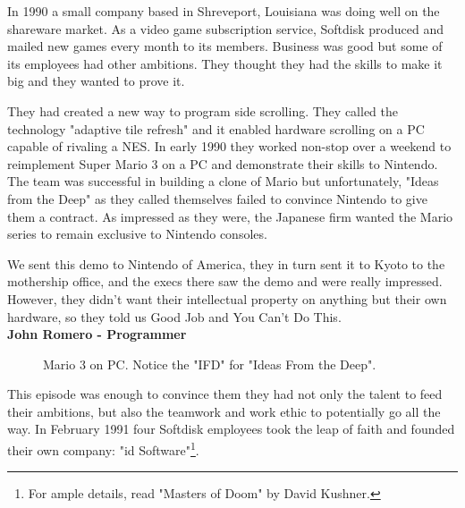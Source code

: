\documentclass[book.tex]{subfiles}
\begin{document}
In 1990 a small company based in Shreveport, Louisiana was doing well on the shareware market. As a video game subscription service, Softdisk produced and mailed new games every month to its members. Business was good but some of its employees had other ambitions. They thought they had the skills to make it big and they wanted to prove it.\\
\par
They had created a new way to program side scrolling. They called the technology "adaptive tile refresh" and it enabled hardware scrolling on a PC capable of rivaling a NES. In early 1990 they worked non-stop over a weekend to reimplement Super Mario 3 on a PC and demonstrate their skills to Nintendo. The team was successful in building a clone of Mario but unfortunately, "Ideas from the Deep" as they called themselves failed to convince Nintendo to give them a contract. As impressed as they were, the Japanese firm wanted the Mario series to remain exclusive to Nintendo consoles.\\
\par
\begin{fancyquotes}
We sent this demo to Nintendo of America, they in turn sent it to Kyoto to the mothership office, and the execs there saw the demo and were really impressed. However, they didn't want their intellectual property on anything but their own hardware, so they told us Good Job and You Can't Do This\protect\footnotemark.
 \bigskip \\
\textbf{John Romero - Programmer}
 \end{fancyquotes}
 \begin{figure}[H]
\caption{Mario 3 on PC. Notice the "IFD" for "Ideas From the Deep".}
\end{figure}

\par
This episode was enough to convince them they had not only the talent to feed their ambitions, but also the teamwork and work ethic to potentially go all the way. In February 1991 four Softdisk employees took the leap of faith and founded their own company: "id Software"\footnote{For ample details, read "Masters of Doom" by David Kushner.}. 
\end{document}
